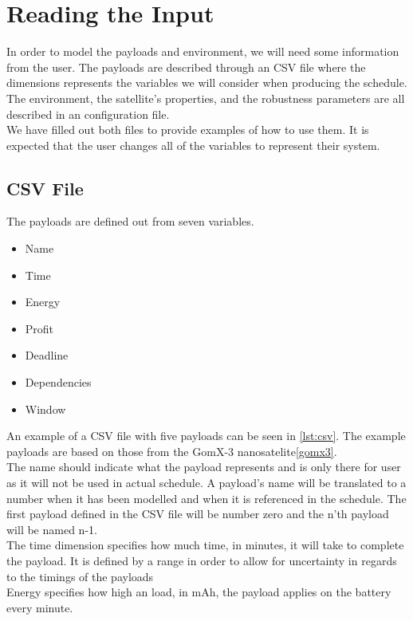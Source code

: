 \section{Reading the Input} \label{sec:read_input}
In order to model the payloads and environment, we will need some information from the user.
The payloads are described through an CSV file where the dimensions represents the variables we will consider when producing the schedule.
The environment, the satellite's properties, and the robustness parameters are all described in an configuration file.\\
We have filled out both files to provide examples of how to use them. 
It is expected that the user changes all of the variables to represent their system.

\subsection{CSV File} \label{subsec:csv}
The payloads are defined out from seven variables.
\begin{itemize}
	\item	Name
	\item	Time
	\item	Energy
	\item	Profit
	\item	Deadline
	\item	Dependencies
	\item	Window
\end{itemize}
An example of a CSV file with five payloads can be seen in \cref{lst:csv}.
The example payloads are based on those from the GomX-3 nanosatelite\ref{gomx3}.\\
The name should indicate what the payload represents and is only there for user as it will not be used in actual schedule.
A payload's name will be translated to a number when it has been modelled and when it is referenced in the schedule. 
The first payload defined in the CSV file will be number zero and the n'th payload will be named n-1.\\
The time dimension specifies how much time, in minutes, it will take to complete the payload.
It is defined by a range in order to allow for uncertainty in regards to the timings of the payloads\\
Energy specifies how high an load, in mAh, the payload applies on the battery every minute.\\
